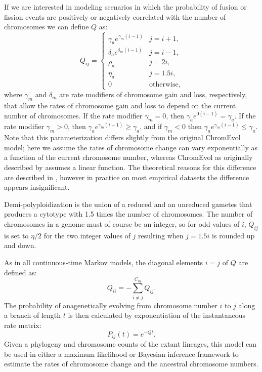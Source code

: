 If we are interested in modeling scenarios in which
the probability of fusion or fission events
are positively or negatively correlated with the number of chromosomes
we can define $Q$ as:
\begin{equation} \label{eq:anagenetic2}
Q_{ij} = 
    \begin{cases}
        \gamma_a e^{\gamma_m (i - 1)}  & j = i + 1,    \\
        \delta_a e^{\delta_m (i - 1)}     & j = i - 1,    \\
        \rho_a                                & j = 2i,       \\
        \eta_a                                 & j = 1.5i,     \\
        0                                   & \mbox{otherwise},   
    \end{cases}
\end{equation}
where $\gamma_m$ and $\delta_m$ are rate modifiers
of chromosome gain and loss, respectively,
that allow the rates of chromosome gain and loss to depend
on the current number of chromosomes.
If the rate modifier $\gamma_m = 0$, then
$\gamma_a e^{0 (i - 1)} = \gamma_a$.
If the rate modifier $\gamma_m > 0$, then
$\gamma_a e^{\gamma_m (i - 1)} \geq \gamma_a$,
and if $\gamma_m < 0$ then
$\gamma_a e^{\gamma_m (i - 1)} \leq \gamma_a$.
Note that this parameterization differs slightly from the original
ChromEvol model; here we assume the rates of chromosome change
can vary exponentially as a function of the current chromosome number,
whereas ChromEvol as originally described by \citet{mayrose2010probabilistic} assumes
a linear function.
The theoretical reasons for this difference are described in \citet{freyman2016cladogenetic},
however in practice on most empirical datasets the difference appears insignificant.


Demi-polyploidization is the union of
a reduced and an unreduced gametes that produces a cytotype 
with 1.5 times the number of chromosomes.
The number of chromosomes in a genome must of course be an integer, 
so for odd values of $i$, $Q_{ij}$ is set to $\eta/2$
for the two integer values of $j$ resulting when $j = 1.5i$ is rounded up and down.


As in all continuous-time Markov models,
the diagonal elements $i = j$ of $Q$ are defined as:
\begin{equation}
    Q_{ii} = - \sum_{i \neq j}^{C_m} Q_{ij}.
\end{equation}
The probability
of anagenetically evolving from chromosome number $i$ to $j$ along a branch
of length $t$ is then calculated by
exponentiation of the instantaneous rate matrix:
\begin{equation} \label{eq:anagenetic_probs}
    P_{ij}(t) = e^{-Qt}.
\end{equation}
Given a phylogeny and chromosome counts of the extant lineages,
this model can be used in either a maximum likelihood or Bayesian inference
framework to estimate the rates of chromosome change and the ancestral
chromosome numbers.

